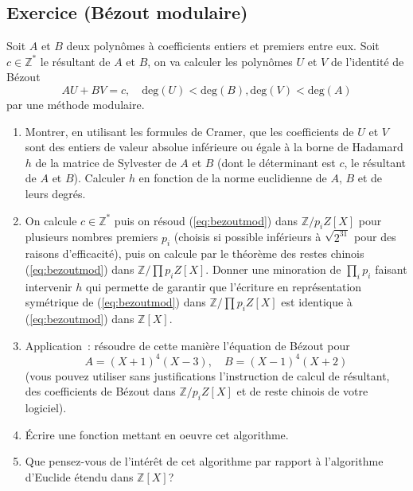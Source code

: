 \documentclass[a4paper,11pt]{article}
\newcommand{\Z}{{\mathbb{Z}}}
\begin{document}
\begin{giacjshere}
\subsection{Exercice (Bézout modulaire)}
Soit $A$ et $B$ deux polynômes à coefficients entiers et premiers
entre eux. Soit $c \in \Z^* $ le résultant de $A$ et $B$,
on va calculer les polynômes $U$ et $V$ de l'identité de Bézout 
\begin{equation} \label{eq:bezoutmod}
 A U + B V = c , \quad \mbox{deg}(U)<\mbox{deg}(B), \mbox{deg}(V)<\mbox{deg}(A)
\end{equation}
par une méthode modulaire.
\begin{enumerate}
\item Montrer, en utilisant les formules de Cramer,
que les coefficients de $U$ et $V$ sont des entiers de
valeur absolue inférieure ou égale à la borne de Hadamard $h$ de
la matrice de Sylvester de $A$ et $B$ (dont le déterminant est $c$,
le résultant de $A$ et $B$). Calculer $h$ en fonction
de la norme euclidienne de $A$, $B$ et de leurs degr\'es. 
\item On calcule $c \in \Z^*$ puis on
résoud (\ref{eq:bezoutmod}) dans $\Z/p_i Z[X]$ pour
plusieurs nombres premiers $p_i$ (choisis si possible inférieurs 
à $\sqrt{2^{31}}$ pour des raisons d'efficacité), puis on calcule par le
théorème des restes chinois (\ref{eq:bezoutmod}) 
dans $\Z/\prod p_i Z[X]$. Donner une minoration de 
$\prod_i p_i$ faisant intervenir $h$ qui permette de garantir
que l'écriture en représentation symétrique de (\ref{eq:bezoutmod})
dans $\Z/\prod p_i Z[X]$ est identique \`a (\ref{eq:bezoutmod}) dans $\Z[X]$.
\item Application~: résoudre de cette manière l'équation de
Bézout pour 
\[ A=(X+1)^4(X-3), \quad B=(X-1)^4(X+2)\] 
(vous pouvez utiliser
sans justifications l'instruction de calcul de r\'esultant,
des coefficients de Bézout dans $\Z/p_iZ[X]$ et 
de reste chinois de votre logiciel).
\item \'Ecrire une fonction mettant en oeuvre cet algorithme.
\item Que pensez-vous de l'intérêt de cet algorithme par rapport à
l'algorithme d'Euclide étendu dans $\Z[X]$?
\end{enumerate}



\end{giacjshere}
\end{document}
